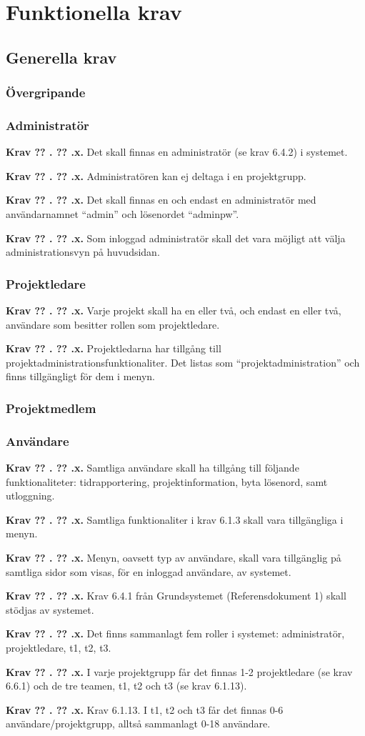\documentclass[a4paper]{article}
\newcommand\getcurrentref[1]{%
 \ifnumequal{\value{#1}}{0}
  {??}
  {\the\value{#1}}%
}
\newcommand\requirement[2]{
	\numberedrow{Krav}{#1}{#2}
}
\newcommand\numberedrow[3]{
	\noindent
	\textbf{#1 \getcurrentref{section}.\getcurrentref{subsection}.#2.} #3
	
}
\begin{document}
\section{Funktionella krav}
	\subsection{Generella krav}
		\label{krav-funk-gen}
		\subsubsection*{Övergripande}
		\subsubsection*{Administratör}
		\requirement{x}{Det skall finnas en administratör (se krav 6.4.2) i systemet.}			
		\requirement{x}{Administratören kan ej deltaga i en projektgrupp. }
		\requirement{x}{Det skall finnas en och endast en administratör med användarnamnet ``admin'' och lösenordet ``adminpw''.}
		\requirement{x}{Som inloggad administratör skall det vara möjligt att välja administrationsvyn på huvudsidan.}

		\subsubsection*{Projektledare}
		\requirement{x}{Varje projekt skall ha en eller två, och endast en eller två, användare som besitter rollen som projektledare.}
\requirement{x}{Projektledarna har tillgång till projektadministrationsfunktionaliter. Det listas som ``projektadministration'' och finns tillgängligt för dem i menyn.}

		\subsubsection*{Projektmedlem}
		\subsubsection*{Användare}
		\requirement{x}{Samtliga användare skall ha tillgång till följande funktionaliteter: tidrapportering, projektinformation, byta lösenord, samt utloggning.}
		
		\requirement{x}{Samtliga funktionaliter i krav 6.1.3 skall vara tillgängliga i menyn.}
		\requirement{x}{Menyn, oavsett typ av användare, skall vara tillgänglig på samtliga sidor som visas, för en inloggad användare, av systemet.}
		\requirement{x}{Krav 6.4.1 från Grundsystemet (Referensdokument 1) skall stödjas av systemet.}
		\requirement{x}{Det finns sammanlagt fem roller i systemet: administratör, projektledare, t1, t2, t3.}
		\requirement{x}{I varje projektgrupp får det finnas 1-2 projektledare (se krav 6.6.1) och de tre teamen, t1, t2 och t3 (se krav 6.1.13).}
		\requirement{x}{Krav 6.1.13. I t1, t2 och t3 får det finnas 0-6 användare/projektgrupp, alltså sammanlagt 0-18 användare.}
\end{document}
